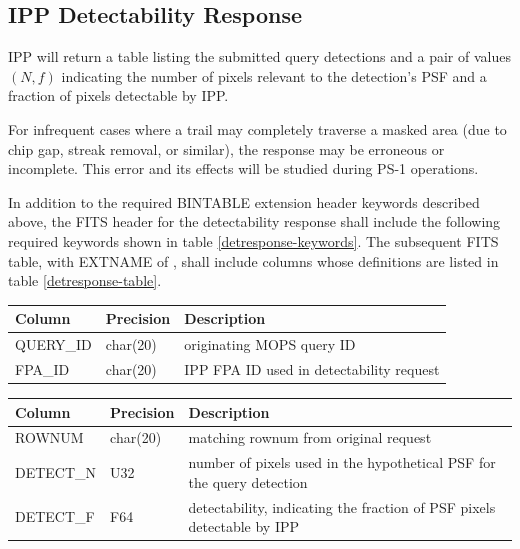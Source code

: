 \documentclass[panstarrs,spec]{panstarrs}
\begin{document}
\subsection{IPP Detectability Response}

IPP will return a table listing the submitted query detections and a
pair of values $(N, f)$ indicating the number of pixels relevant to the detection's PSF
and a fraction of pixels detectable by IPP.

For infrequent cases where a trail may completely traverse a masked area (due to chip gap, streak removal, or similar), the response may be erroneous or incomplete.  This error and its effects will be studied during PS-1 operations.

In addition to the required BINTABLE extension header keywords
described above, the FITS header for the detectability response shall include
the following required keywords shown in table \ref{detresponse-keywords}.
The subsequent FITS table, with EXTNAME of , shall include 
columns whose definitions are listed in table \ref{detresponse-table}.

{\centering%
\small
{}
\begin{tabular}{lll}
\hline
\hline
{\bf Column}            & {\bf Precision} & {\bf Description} \\
\hline
QUERY\_ID   & char(20)    & originating MOPS query ID \\
FPA\_ID     & char(20)    & IPP FPA ID used in detectability request \\
\end{tabular}
}

{\centering%
\small
{}
\begin{tabular}{lll}
\hline
\hline
{\bf Column}            & {\bf Precision} & {\bf Description} \\
\hline
ROWNUM      & char(20) & matching rownum from original request \\
DETECT\_N   & U32 & number of pixels used in the hypothetical PSF for the query detection \\
DETECT\_F   & F64 & detectability, indicating the fraction of PSF pixels detectable by IPP \\
\end{tabular}
}
\end{document}

